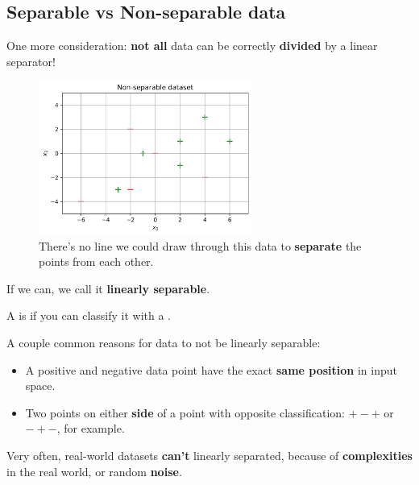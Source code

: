     \subsection{Separable vs Non-separable data}
    
        One more consideration: \textbf{not all} data can be correctly \textbf{divided} by a linear separator!
        
        \begin{figure}[H]
            \centering
            
            \includegraphics[width=70mm,scale=0.5]{images/classification_images/non_separable_dataset.png}
            \caption*{There's no line we could draw through this data to \textbf{separate} the points from each other.}
        \end{figure}
            
        If we can, we call it \textbf{linearly separable}.\\
        
        \begin{definition}
            A  is  if you can  classify it with a .
        \end{definition}
        
        A couple common reasons for data to not be linearly separable:
        
        \begin{itemize}
            \item A positive and negative data point have the exact\textbf{ same position} in input space.
            
            \item Two points on either \textbf{side} of a point with opposite classification: $+-+$ or $-+-$, for example.
        \end{itemize}
        
        Very often, real-world datasets \textbf{can't} linearly separated, because of \textbf{complexities} in the real world, or random \textbf{noise}.
        
